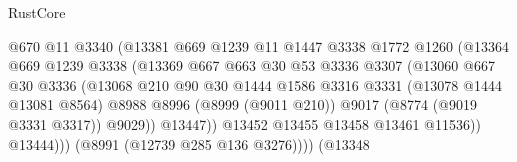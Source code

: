 \begin{lexlean}{RustCore}
\begin{coremodule}
                                        @670
                                        @11
                                        @3340
                                        (@13381
                                          @669
                                          @1239
                                          @11
                                          @1447
                                          @3338
                                          @1772
                                          @1260
                                          (@13364
                                            @669
                                            @1239
                                            @3338
                                            (@13369
                                              @667
                                              @663
                                              @30
                                              @53
                                              @3336
                                              @3307
                                              (@13060
                                                @667
                                                @30
                                                @3336
                                                (@13068
                                                  @210
                                                  @90
                                                  @30
                                                  @1444
                                                  @1586
                                                  @3316
                                                  @3331
                                                  (@13078 @1444 @13081 @8564)
                                                  @8988
                                                  @8996
                                                  (@8999 (@9011 @210))
                                                  @9017
                                                  (@8774 (@9019 @3331 @3317))
                                                  @9029))
                                              @13447))
                                          @13452
                                          @13455
                                          @13458
                                          @13461
                                          @11536))
                                      @13444)))
                                (@8991 (@12739 @285 @136 @3276))))
                            (@13348

\end{coremodule}
\end{lexlean}
